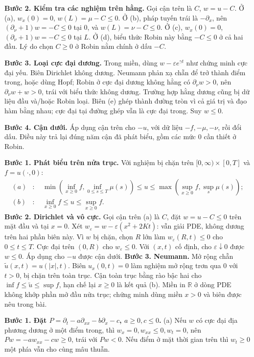 \textbf{Bước 2. Kiểm tra các nghiệm trên hằng.} Gọi cận trên là $C$, $w=u-C$. Ở (a), $w_x(0)=0$, $w(L)=\mu-C\le0$. Ở (b), pháp tuyến trái là $-\partial_x$, nên $(\partial_\nu+1)w=-C\le0$ tại $0$, và $w(L)=\nu-C\le0$. Ở (c), $w_x(0)=0$, $(\partial_\nu+1)w=-C\le0$ tại $L$. Ở (d), biểu thức Robin này bằng $-C\le0$ ở cả hai đầu. Lý do chọn $C\ge0$ ở Robin nằm chính ở dấu $-C$.

\textbf{Bước 3. Loại cực đại dương.} Trong miền, dùng $w-\varepsilon e^{\gamma t}$ như chứng minh cực đại yếu. Biên Dirichlet không dương. Neumann phản xạ chẵn để trở thành điểm trong, hoặc dùng Hopf; Robin ở cực đại dương không hằng có $\partial_\nu w>0$, nên $\partial_\nu w+w>0$, trái với biểu thức không dương. Trường hợp hằng dương cũng bị dữ liệu đầu và/hoặc Robin loại. Biên (e) ghép thành đường tròn vì cả giá trị và đạo hàm bằng nhau; cực đại tại đường ghép vẫn là cực đại trong. Suy $w\le0$.

\textbf{Bước 4. Cận dưới.} Áp dụng cận trên cho $-u$, với dữ liệu $-f,-\mu,-\nu$, rồi đổi dấu. Điều này trả lại đúng năm cận đã phát biểu, gồm các mức $0$ cần thiết ở Robin.

\textbf{Bước 1. Phát biểu trên nửa trục.} Với nghiệm bị chặn trên $[0,\infty)\times[0,T]$ và $f=u(\cdot,0)$:
\begin{align*}
(a)&:\quad \min(\inf_{x\ge0}f,\inf_{0\le s\le T}\mu(s))
\le u\le\max(\sup_{x\ge0}f,\sup_s\mu(s));\\
(b)&:\quad \inf_{x\ge0}f\le u\le\sup_{x\ge0}f.
\end{align*}
\textbf{Bước 2. Dirichlet và vô cực.} Gọi cận trên (a) là $C$, đặt $w=u-C\le0$ trên mặt đầu và tại $x=0$. Xét $w_\varepsilon=w-\varepsilon(x^2+2Kt)$: vẫn giải PDE, không dương trên hai phần biên này. Vì $w$ bị chặn, chọn $R$ lớn làm $w_\varepsilon(R,t)\le0$ cho $0\le t\le T$. Cực đại trên $(0,R)$ cho $w_\varepsilon\le0$. Với $(x,t)$ cố định, cho $\varepsilon\downarrow0$ được $w\le0$. Áp dụng cho $-u$ được cận dưới.
\textbf{Bước 3. Neumann.} Mở rộng chẵn $\widetilde u(x,t)=u(|x|,t)$. Biên $u_x(0,t)=0$ làm nghiệm mở rộng trơn qua $0$ với $t>0$, bị chặn trên toàn trục. Cận toàn trục bằng rào bậc hai cho $\inf f\le\widetilde u\le\sup f$, hạn chế lại $x\ge0$ là kết quả (b).
Miền in $\mathbb R$ ở dòng PDE không khớp phần mở đầu nửa trục; chứng minh dùng miền $x>0$ và biên được nêu trong bài.

\textbf{Bước 1. Đặt $P=\partial_t-a\partial_{xx}-b\partial_x-c$, $a\ge0,c\le0$.}
(a) Nếu $w$ có cực đại địa phương dương ở một điểm trong, thì $w_x=0,w_{xx}\le0,w_t=0$, nên $Pw=-aw_{xx}-cw\ge0$, trái với $Pw<0$. Nếu điểm ở mặt thời gian trên thì $w_t\ge0$ một phía vẫn cho cùng mâu thuẫn.

